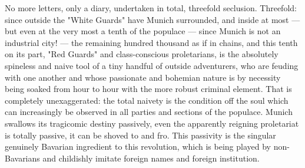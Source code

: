 No more letters, only a diary, undertaken in total, threefold seclusion. Threefold: since outside the "White Guards" have Munich surrounded, and inside at most — but even at the very most a tenth of the populace — since Munich is not an industrial city! — the remaining hundred thousand as if in chains, and this tenth on its part, "Red Guards" and class-conscious proletarians, is the absolutely spineless and naive tool of a tiny handful of outside adventurers, who are feuding with one another and whose passionate and bohemian nature is by necessity being soaked from hour to hour with the more robust criminal element. That is completely unexaggerated: the total naivety is the condition off the soul which can increasingly be observed in all parties and sections of the populace. Munich swallows its tragicomic destiny passively, even the apparently reigning proletariat is totally passive, it can be shoved to and fro. This passivity is the singular genuinely Bavarian ingredient to this revolution, which is being played by non-Bavarians and childishly imitate foreign names and foreign institution.

